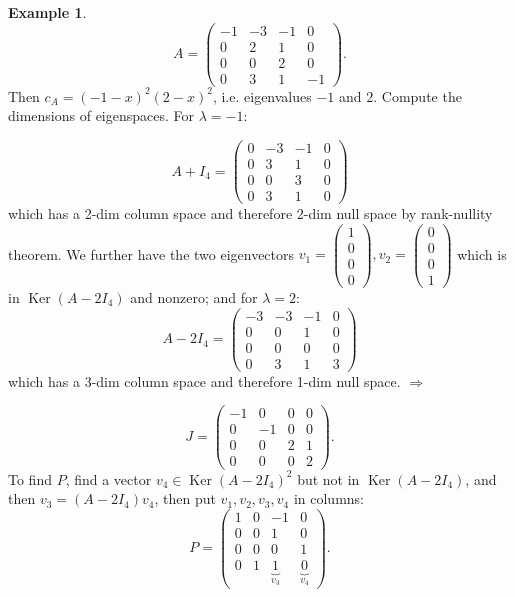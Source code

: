 \documentclass[a4paper]{article}
\newcommand{\Ker}{\operatorname{Ker}}
\theoremstyle{definition}
\newtheorem{example}[defn]{Example}
\begin{document}
\begin{example}
\[
A=\begin{pmatrix}
-1 & -3 & -1 & 0\\ 0 & 2 & 1 & 0\\ 0 & 0 & 2 & 0\\ 0 & 3 & 1 & -1
\end{pmatrix} .
\]
Then $c_{A}=(-1-x)^2 (2-x)^2$, i.e. eigenvalues $-1$ and $2$. Compute the dimensions of eigenspaces. For $\lambda=-1$:

\[
A+I_4=\begin{pmatrix}
0 & -3 & -1 & 0\\ 0 & 3 & 1 & 0\\ 0 & 0 & 3 & 0\\ 0 & 3 & 1 & 0
\end{pmatrix}
\]
which has a 2-dim column space and therefore 2-dim null space by rank-nullity theorem. We further have the two eigenvectors $v_1=\begin{pmatrix}1\\0\\0\\0\end{pmatrix},v_2=\begin{pmatrix}0\\0\\0\\1\end{pmatrix}$ which is in $\Ker (A-2I_4)$ and nonzero; and for $\lambda=2$:
\[
A-2I_4=\begin{pmatrix}
-3 & -3 & -1 & 0\\ 0 & 0 & 1 & 0\\ 0 & 0 & 0 & 0\\ 0 & 3 & 1 & 3
\end{pmatrix}
\]
which has a 3-dim column space and therefore 1-dim null space. $\Rightarrow$

\[
J=\begin{pmatrix}
-1 & 0 & 0 & 0\\ 0 & -1 & 0 & 0\\ 0 & 0 & 2 & 1\\ 0 & 0 & 0 & 2
\end{pmatrix} .
\]
To find $P$, find a vector $v_4\in \Ker (A-2I_4)^2$ but not in $\Ker (A-2I_4)$, and then $v_3=(A-2I_4)v_4$, then put $v_1,v_2,v_3,v_4$ in columns:
\[
P=\begin{pmatrix}
1 & 0 & -1 & 0\\ 0 & 0 & 1 & 0\\ 0 & 0 & 0 & 1\\ 0 & 1 & \underbrace{1}_{v_3} & \underbrace{0}_{v_4}
\end{pmatrix} .
\]
\end{example}
\end{document}
